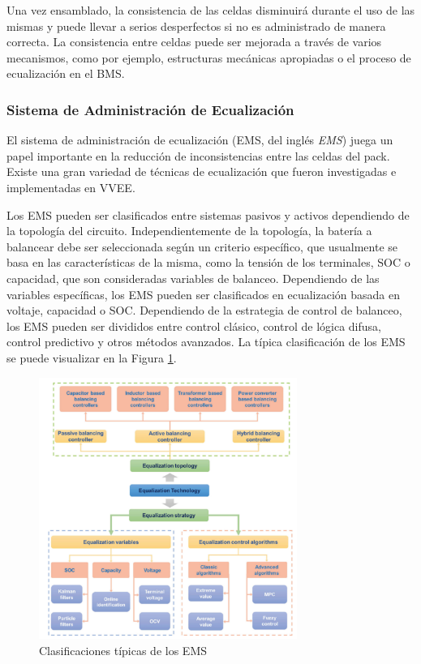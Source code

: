 \documentclass[10pt,a4paper]{article}
\newcounter{subsubsubsection}[subsubsection]
\begin{document}
Una vez ensamblado, la consistencia de las celdas disminuir\'a durante el uso de
las mismas y puede llevar a serios desperfectos si no es administrado de manera
correcta. La consistencia entre celdas puede ser mejorada a trav\'es de varios
mecanismos, como por ejemplo, estructuras mec\'anicas apropiadas o el proceso de 
ecualizaci\'on en el \acrshort{BMS}.

\subsubsection{Sistema de Administraci\'on de Ecualizaci\'on}

El sistema de administraci\'on de ecualizaci\'on (\acrshort{EMS}, del ingl\'es
\emph{\acrlong{EMS}}) juega un papel importante en la reducci\'on de
inconsistencias entre las celdas del pack. Existe una gran variedad de
t\'ecnicas de ecualizaci\'on que fueron investigadas e implementadas en
\acrshort{VVEE}.


Los \acrshort{EMS} pueden ser clasificados entre sistemas pasivos y activos
dependiendo de la topolog\'ia del circuito. Independientemente de la
topolog\'ia, la bater\'ia a balancear debe ser seleccionada seg\'un un criterio
espec\'ifico, que usualmente se basa en las caracter\'isticas de la misma, como
la tensi\'on de los terminales, \acrshort{SOC} o capacidad, que son consideradas
variables de balanceo. Dependiendo de las variables espec\'ificas, los 
\acrshort{EMS} pueden ser clasificados en ecualizaci\'on basada en voltaje, 
capacidad o \acrshort{SOC}. Dependiendo de la estrategia de control de balanceo,
los \acrshort{EMS} pueden ser divididos entre control cl\'asico, control de 
l\'ogica difusa, control predictivo y otros m\'etodos avanzados. La t\'ipica
clasificaci\'on de los \acrshort{EMS} se puede visualizar en la Figura
\ref{ems_classes}.

\begin{figure}[h!]
    \begin{center}
        \includegraphics[width=0.75\textwidth]{ems_class.png}
        \caption{Clasificaciones t\'ipicas de los \acrshort{EMS}}
        \label{ems_classes}
    \end{center}
\end{figure}
\end{document}

